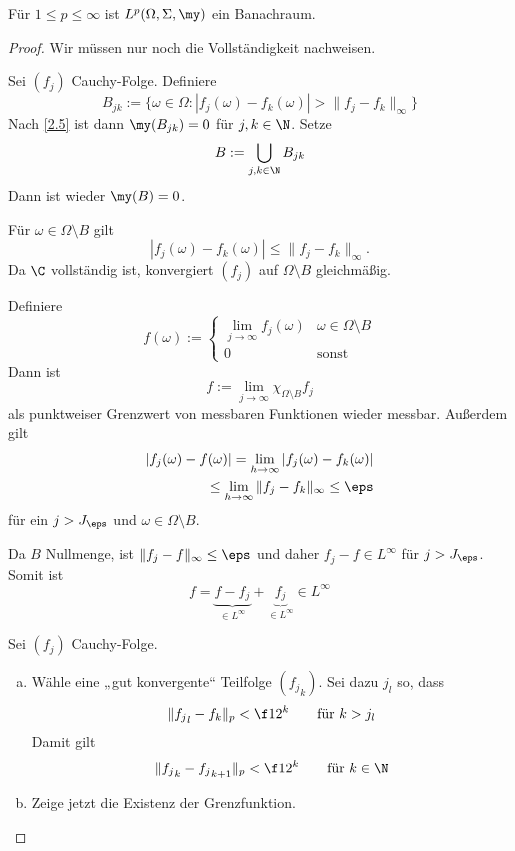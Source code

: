 \documentclass{mycourse}
\begin{document}
\begin{st} \label{2.12}
	Für $1 \le p \le \infty$ ist $L^p(\Omega, \Sigma, \my)$ ein Banachraum.
	\begin{proof}
		Wir müssen nur noch die Vollständigkeit nachweisen.
		\begin{seg}[$p=\infty$]
			Sei $(f_j)$ Cauchy-Folge.
			Definiere
			\[
				B_{jk} := \Big\{ \omega \in \Omega : |f_j(\omega) - f_k(\omega)| > \|f_j-f_k\|_\infty \Big\}
			\]
			Nach \ref{2.5} ist dann $\my(B_{jk}) = 0$ für $j,k\in \N$. 
			Setze
			\[
				B := \bigcup_{j,k\in \N} B_{jk}
			\]
			Dann ist wieder $\my(B) = 0$.

			Für $\omega \in \Omega \setminus B$ gilt
			\[
				|f_j(\omega) - f_k(\omega)| \le \|f_j-f_k\|_\infty.
			\]
			Da $\C$ vollständig ist, konvergiert $(f_j)$ auf $\Omega \setminus B$ gleichmäßig.

			Definiere
			\[
				f(\omega) := \begin{cases}
					\lim_{j \to \infty} f_j(\omega) & \omega \in \Omega \setminus B \\
					0 & \text{sonst}
				\end{cases}
			\]
			Dann ist
			\[
				f := \lim_{j\to \infty} \chi_{\Omega \setminus B} f_j
			\]
			als punktweiser Grenzwert von messbaren Funktionen wieder messbar.
			Außerdem gilt
			\begin{align*}
				|f_j(\omega) - f(\omega) |
				= \lim_{h\to \infty} |f_j(\omega) - f_k(\omega)| \\
				\le \lim_{h\to \infty} \|f_j - f_k\|_{\infty}
				\le \eps
			\end{align*}
			für ein $j > J_\eps$ und $\omega \in \Omega \setminus B$.

			Da $B$ Nullmenge, ist $\|f_j - f\|_\infty \le \eps$ und daher $f_j - f \in L^\infty$ für $j > J_\eps$.
			Somit ist
			\[
				f = \underbrace{f - f_j}_{\in L^\infty} + \underbrace{f_j}_{\in L^\infty} \in L^\infty
			\]
		\end{seg}
		\begin{seg}[$1 \le p < \infty$]
			Sei $(f_j)$ Cauchy-Folge.
			\begin{enumerate}[a)]
				\item
					Wähle eine „gut konvergente“ Teilfolge $({f_j}_k)$.
					Sei dazu $j_l$ so, dass 
					\[
						\|{f_j}_l - f_k\|_p < \f 1{2^k} \qquad \text{für $k>j_l$}
					\]
					Damit gilt
					\[
						\|{f_j}_k - {f_j}_{k+1} \|_p < \f 1{2^k} \qquad \text{für $k \in \N$}
					\]
				\item
					Zeige jetzt die Existenz der Grenzfunktion.


\end{enumerate}
\end{seg}
\end{proof}
\end{st}
\end{document}
